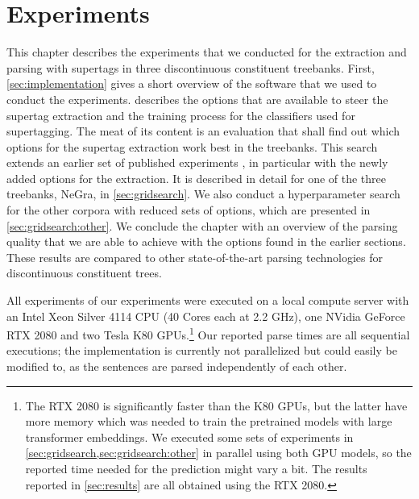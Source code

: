 \documentclass[../document.tex]{subfiles}
\begin{document}
    \chapter{Experiments}\label{sec:experiments}
    
    This chapter describes the experiments that we conducted for the extraction and parsing with supertags in three discontinuous constituent treebanks.
    First, \cref{sec:implementation} gives a short overview of the software that we used to conduct the experiments.
     describes the options that are available to steer the supertag extraction and the training process for the classifiers used for supertagging.
    The meat of its content is an evaluation that shall find out which options for the supertag extraction work best in the treebanks.
    This search extends an earlier set of published experiments \citep{Rup22}, in particular with the newly added options for the extraction.
    It is described in detail for one of the three treebanks, NeGra, in \cref{sec:gridsearch}.
    We also conduct a hyperparameter search for the other corpora with reduced sets of options, which are presented in \cref{sec:gridsearch:other}.
    We conclude the chapter with an overview of the parsing quality that we are able to achieve with the options found in the earlier sections.
    These results are compared to other state-of-the-art parsing technologies for discontinuous constituent trees.

    All experiments of our experiments were executed on a local compute server with an Intel Xeon Silver 4114 CPU (40 Cores each at 2.2 GHz), one NVidia GeForce RTX 2080 and two Tesla K80 GPUs.\footnote{
        The RTX 2080 is significantly faster than the K80 GPUs, but the latter have more memory which was needed to train the pretrained models with large transformer embeddings.
        We executed some sets of experiments in \cref{sec:gridsearch,sec:gridsearch:other} in parallel using both GPU models, so the reported time needed for the prediction might vary a bit.
        The results reported in \cref{sec:results} are all obtained using the RTX 2080. 
    }
    Our reported parse times are all sequential executions; the implementation is currently not parallelized but could easily be modified to, as the sentences are parsed independently of each other.
    
    
    
    
    
    

    \ifSubfilesClassLoaded{%
        \printindex
    }{}
\end{document}
